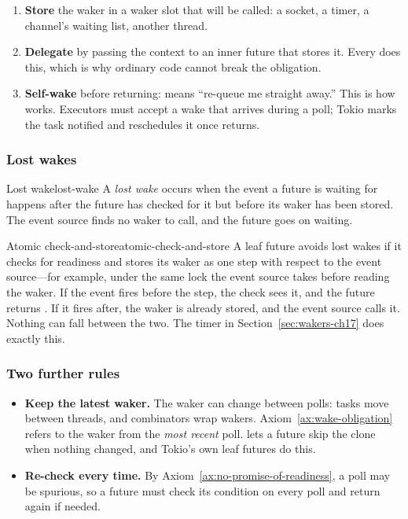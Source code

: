 \begin{enumerate}
    \item \textbf{Store} the waker in a waker slot that will be called: a socket, a timer, a channel's waiting list, another thread.
    \item \textbf{Delegate} by passing the context to an inner future that stores it. Every  does this, which is why ordinary  code cannot break the obligation.
    \item \textbf{Self-wake} before returning:  means ``re-queue me straight away.'' This is how  works. Executors must accept a wake that arrives during a poll; Tokio marks the task notified and reschedules it once  returns.
\end{enumerate}

\subsubsection{Lost wakes}

\begin{definition}{Lost wake}{lost-wake}
    A \emph{lost wake} occurs when the event a future is waiting for happens after the future has checked for it but before its waker has been stored. The event source finds no waker to call, and the future goes on waiting.
\end{definition}

\begin{lemma}{Atomic check-and-store}{atomic-check-and-store}
    A leaf future avoids lost wakes if it checks for readiness and stores its waker as one step with respect to the event source---for example, under the same lock the event source takes before reading the waker.
    \why If the event fires before the step, the check sees it, and the future returns . If it fires after, the waker is already stored, and the event source calls it. Nothing can fall between the two. The timer in Section~\ref{sec:wakers-ch17} does exactly this.
\end{lemma}

\subsubsection{Two further rules}

\begin{itemize}
    \item \textbf{Keep the latest waker.} The waker can change between polls: tasks move between threads, and combinators wrap wakers. Axiom~\ref{ax:wake-obligation} refers to the waker from the \emph{most recent} poll.  lets a future skip the clone when nothing changed, and Tokio's own leaf futures do this.
    \item \textbf{Re-check every time.} By Axiom~\ref{ax:no-promise-of-readiness}, a poll may be spurious, so a future must check its condition on every poll and return  again if needed.
\end{itemize}

